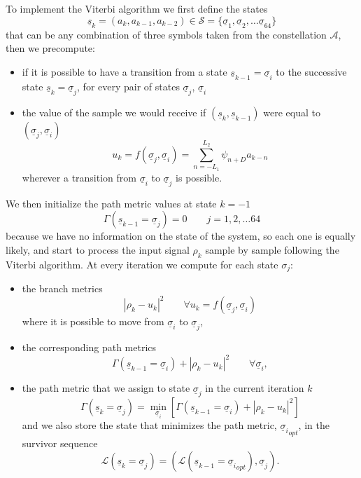 \documentclass[a4paper,oneside]{article}
\renewcommand{\vec}[1]{\underline{#1}}
\newcommand{\abs}[1]{\left|#1\right|}
\newcommand{\vsigma}[0]{\vec{\sigma}}
\begin{document}
To implement the Viterbi algorithm we first define the states
\begin{equation}
  \vec{s}_k = (a_k,a_{k-1}, a_{k-2}) \in \mathcal{S} = \{ \vec{\sigma}_1, \vec{\sigma}_2, \dots \vec{\sigma}_{64} \}
\end{equation}
that can be any combination of three symbols taken from the
constellation $\mathcal{A}$, then we precompute:
\begin{itemize}
  \item if it is possible to have a transition from a state
    $\vec{s}_{k-1} = \vec{\sigma}_i$ to the successive state
    $\vec{s}_{k} = \vec{\sigma}_j$, for every pair of states
    $\vec{\sigma}_j$, $\vec{\sigma}_i$    
\item the value of the sample we would receive if
  $(\vec{s}_k,\vec{s}_{k-1})$ were equal to $(\vsigma_j, \vsigma_i)$
  \begin{equation}
    u_k = f(\vec{\sigma}_j, \vec{\sigma}_i) =
    \sum_{n=-L_1}^{L_2}\psi_{n+D}a_{k-n}
  \end{equation} wherever a transition from $\vec{\sigma}_i$ to $\vec{\sigma}_j$ is
  possible.
\end{itemize}
We then initialize the path metric values at state $k=-1$
\begin{equation}
  \Gamma(\vec{s}_{k-1} = \vec{\sigma}_j) = 0 \qquad j=1,2,\dots64
\end{equation}
because we have no information on the state of the system, so each one
is equally likely, and start to process the input signal $\rho_k$
sample by sample following the Viterbi algorithm. At every iteration
we compute for each state $\sigma_j$:
\begin{itemize}
\item the branch metrics
  \begin{equation}
    \abs{\rho_k - u_k}^2 \qquad \forall u_k = f(\vsigma_j,\vsigma_i)
  \end{equation}
    where it is possible to move from $\vsigma_i$ to $\vsigma_j$,
  \item the corresponding path metrics
    \begin{equation}
      \Gamma(\vec{s}_{k-1} = \vec{\sigma}_i) + \abs{\rho_k - u_k}^2 \qquad \forall \vsigma_i ,
    \end{equation}
  \item the path metric that we assign to state $\vsigma_j$ in the
    current iteration $k$
    \begin{equation}
      \Gamma(\vec{s}_k = \vec{\sigma}_j) = \min_{\vsigma_i} \left[ \Gamma(\vec{s}_{k-1} = \vec{\sigma}_i) + \abs{\rho_k - u_k}^2 \right]
    \end{equation}
    and we also store the state that minimizes the path metric,
    ${\vsigma_i}_{opt}$, in the survivor sequence
    \begin{equation}
      \mathcal{L}(\vec{s}_k = \vsigma_j) = (\mathcal{L}(\vec{s}_{k-1} = {\vsigma_i}_{opt}), \vsigma_j) .
    \end{equation}
\end{itemize}
\end{document}
